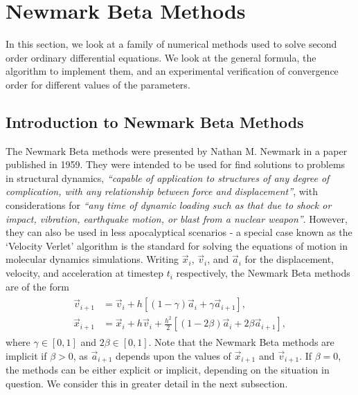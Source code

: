 \documentclass[../Main.tex]{subfiles}
\begin{document}
\section{Newmark Beta Methods}

In this  section, we look at a family of numerical methods used to solve second order ordinary differential equations. We look at the general formula, the algorithm to implement them, and an experimental verification of convergence order for different values of the parameters.

\subsection{Introduction to Newmark Beta Methods}\label{subsection:intro_newmark-beta}
The Newmark Beta methods were presented by Nathan M. Newmark in a paper \cite{Newmark1959} published in 1959. They were intended to be used for find solutions to problems in structural dynamics, \textit{``capable of application to structures of any degree of complication, with any relationship between force and displacement''}, with considerations for \textit{``any time of dynamic loading such as that due to shock or impact, vibration, earthquake motion, or blast from a nuclear weapon''}. However, they can also be used in less apocalyptical scenarios -  a special case known as the `Velocity Verlet' algorithm is the standard for solving the equations of motion in molecular dynamics simulations.
Writing $\vec{x}_{i}$, $\vec{v}_{i}$, and $\vec{a}_{i}$ for the displacement, velocity, and acceleration at timestep $t_{i}$ respectively, the Newmark Beta methods are of the form
\begin{align}
	\begin{split}
		\vec{v}_{i+1} & = \vec{v}_{i} + h\left[\left(1-\gamma \right)\vec{a}_{i} + \gamma \vec{a}_{i+1}\right], \\
		\vec{x}_{i+1} & = \vec{x}_{i} + h\vec{v}_{i} + \frac{h^2}{2}\left[ \left(1-2\beta \right)\vec{a}_{i} + 2\beta \vec{a}_{i+1}\right] ,
	\end{split} \label{eqn:newmark-beta}
\end{align} where $\gamma \in \left[0, 1 \right]$ and $2\beta \in \left[0, 1 \right]$. Note that the Newmark Beta methods are implicit if $\beta > 0$, as $\vec{a}_{i+1}$ depends upon the values of $\vec{x}_{i+1}$ and $\vec{v}_{i+1}$. If $\beta = 0$, the methods can be either explicit or implicit, depending on the situation in question. We consider this in greater detail in the next subsection.
\end{document}
